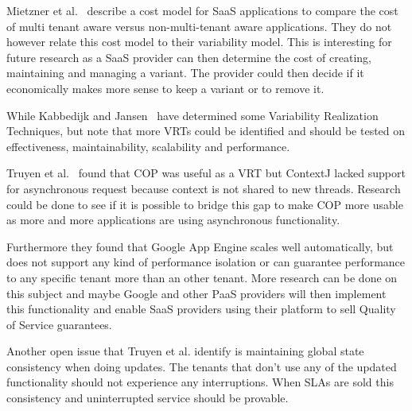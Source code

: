 Mietzner et al.~\cite{mietzner2009variability} describe a cost model for SaaS applications to compare the cost of multi tenant aware versus non-multi-tenant aware applications. They do not however relate this cost model to their variability model. This is interesting for future research as a SaaS provider can then determine the cost of creating, maintaining and managing a variant. The provider could then decide if it economically makes more sense to keep a variant or to remove it.


While Kabbedijk and Jansen~\cite{kabbedijk2011variability} have determined some Variability Realization Techniques, but note that more VRTs could be identified and should be tested on effectiveness, maintainability, scalability and performance.

Truyen et al.~\cite{truyen2012context} found that COP was useful as a VRT but ContextJ lacked support for asynchronous request because context is not shared to new threads. Research could be done to see if it is possible to bridge this gap to make COP more usable as more and more applications are using asynchronous functionality.

Furthermore they found that Google App Engine scales well automatically, but does not support any kind of performance isolation or can guarantee performance to any specific tenant more than an other tenant. More research can be done on this subject and maybe Google and other PaaS providers will then implement this functionality and enable SaaS providers using their platform to sell Quality of Service guarantees.

Another open issue that Truyen et al. identify is maintaining global state consistency when doing updates. The tenants that don't use any of the updated functionality should not experience any interruptions. When SLAs are sold this consistency and uninterrupted service should be provable.


